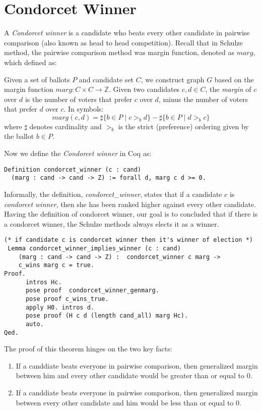  \section{Condorcet Winner}
	A \textit{Condorcet winner} is a candidate who beats every other candidate in pairwise comparison (also known as head to head competition). 
	Recall that in Schulze method, the pairwise comparison method was margin function, denoted as $marg$, which defined as:
	\begin{displayquote}
	Given a set of ballots $P$ and candidate set $C$, we construct graph $G$ based on the margin function $marg: C \times C \to \mathbb{Z}$. Given two candidates $c, d \in C$,
the \emph{margin} of $c$ over $d$ is
the number of voters that prefer $c$ over $d$, minus the number of voters that prefer $d$ over $c$. 
In symbols:
\[
  marg(c, d) = \sharp \lbrace b \in P \mid c >_b d \rbrace -
            \sharp \lbrace b \in P \mid d >_b c \rbrace
\] where $\sharp$ denotes cardinality and $>_b$ is the strict
(preference) ordering given by the ballot $b \in P$.
 
 \end{displayquote}
  
	 
  Now we define the \textit{Condorcet winner} in Coq as:
 \begin{verbatim}
Definition condorcet_winner (c : cand) 
  (marg : cand -> cand -> Z) := forall d, marg c d >= 0.
\end{verbatim}

  Informally, the definition, \textit{condorcet\_winner}, states that 
  if a candidate $c$  is \textit{condorcet winner}, then she has been ranked higher against
  every other candidate.  Having the definition of  condorcet winner, our goal is to concluded that if there is 
 	a condorcet winner, the Schulze methods always elects it as a winner.  
 	
\begin{verbatim}
(* if candidate c is condorcet winner then it's winner of election *)
 Lemma condorcet_winner_implies_winner (c : cand) 
    (marg : cand -> cand -> Z) :  condorcet_winner c marg ->
    c_wins marg c = true. 
Proof.
      intros Hc. 
      pose proof  condorcet_winner_genmarg.
      pose proof c_wins_true.
      apply H0. intros d.
      pose proof (H c d (length cand_all) marg Hc).
      auto.
Qed.
\end{verbatim}
 		
 The proof of this theorem hinges on the two key facts:
 \begin{enumerate}
  \item If a canddiate beats everyone in pairwise comparison, then generalized margin between him and every other candidate would 
      be  greater than or equal to 0.
  \item If a canddiate beats everyone in pairwise comparison, then generalized margin between every other candidate and him would 
      be  less than or equal to 0.
 \end{enumerate}
 
